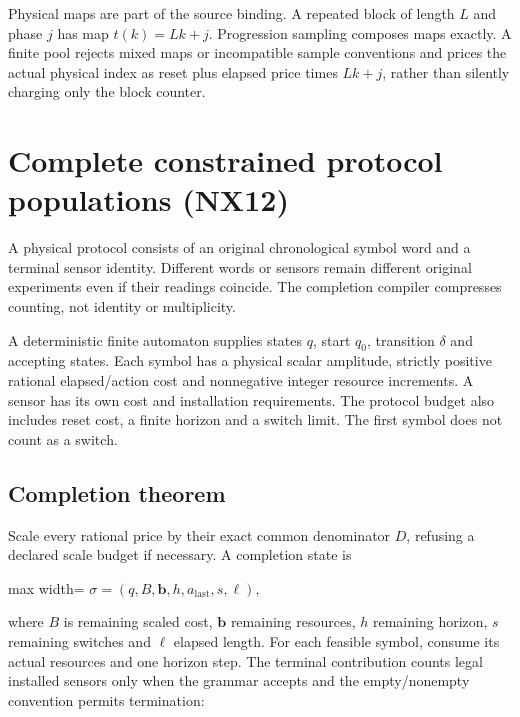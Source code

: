 \documentclass[
  11pt,
  a4paper,
]{report}
\begin{document}
Physical maps are part of the source binding. A repeated block of length
\(L\) and phase \(j\) has map \(t(k)=Lk+j\). Progression sampling
composes maps exactly. A finite pool rejects mixed maps or incompatible
sample conventions and prices the actual physical index as reset plus
elapsed price times \(Lk+j\), rather than silently charging only the
block counter.

\hypertarget{complete-constrained-protocol-populations-nx12}{%
\chapter{Complete constrained protocol populations
(NX12)}\label{complete-constrained-protocol-populations-nx12}}

A physical protocol consists of an original chronological symbol word
and a terminal sensor identity. Different words or sensors remain
different original experiments even if their readings coincide. The
completion compiler compresses counting, not identity or multiplicity.

A deterministic finite automaton supplies states \(q\), start \(q_0\),
transition \(\delta\) and accepting states. Each symbol has a physical
scalar amplitude, strictly positive rational elapsed/action cost and
nonnegative integer resource increments. A sensor has its own cost and
installation requirements. The protocol budget also includes reset cost,
a finite horizon and a switch limit. The first symbol does not count as
a switch.

\hypertarget{completion-theorem}{%
\section{Completion theorem}\label{completion-theorem}}

Scale every rational price by their exact common denominator \(D\),
refusing a declared scale budget if necessary. A completion state is

\begin{center}
\begin{adjustbox}{max width=\linewidth}
$\displaystyle
\sigma=(q,B,\mathbf b,h,a_{\mathrm{last}},s,\ell),
$
\end{adjustbox}
\end{center}

where \(B\) is remaining scaled cost, \(\mathbf b\) remaining resources,
\(h\) remaining horizon, \(s\) remaining switches and \(\ell\) elapsed
length. For each feasible symbol, consume its actual resources and one
horizon step. The terminal contribution counts legal installed sensors
only when the grammar accepts and the empty/nonempty convention permits
termination:
\end{document}
